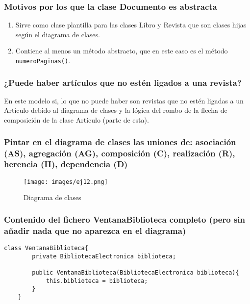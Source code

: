 \documentclass[a4paper,12pt]{article}
\begin{document}
\subsubsection*{Motivos por los que la clase Documento es abstracta}
\begin{enumerate}
    \item Sirve como clase plantilla para las clases Libro y Revista que son clases hijas según el diagrama de clases.
    \item Contiene al menos un método abstracto, que en este caso es el método \texttt{numeroPaginas()}.
\end{enumerate}

\subsubsection*{¿Puede haber artículos que no estén ligados a una revista?}

En este modelo si, lo que no puede haber son revistas que no estén ligadas a un Artículo debido al diagrama de clases y la lógica del rombo de la flecha de composición de la clase Artículo (parte de esta).

\subsubsection*{Pintar en el diagrama de clases las uniones de: asociación (AS), agregación (AG), composición (C), realización (R), herencia (H), dependencia (D)}

\begin{figure}[H]
    \centering
    \texttt{[image: images/ej12.png]}
    \caption{Diagrama de clases}
    \label{fig:ejercicio12}
\end{figure}

\subsubsection*{Contenido del fichero VentanaBiblioteca completo (pero sin añadir nada que no aparezca en el diagrama)}

\begin{lstlisting}[style=customjava, caption={VentanaBiblioteca, el constructor se puede obviar, ya que usaríamos el por defecto}]
    class VentanaBiblioteca{
        private BibliotecaElectronica biblioteca;

        public VentanaBiblioteca(BibliotecaElectronica biblioteca){
            this.biblioteca = biblioteca;
        }
    }
\end{lstlisting}
\end{document}
